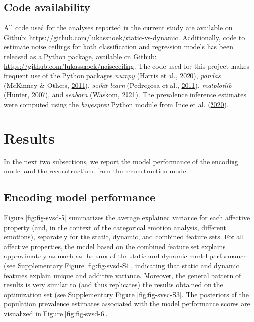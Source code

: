\documentclass[11pt,american,a4paper,oneside,]{memoir} %
\begin{document}
\hypertarget{svsd-code}{%
\subsection{Code availability}\label{svsd-code}}

All code used for the analyses reported in the current study are available on Github: \url{https://github.com/lukassnoek/static-vs-dynamic}. Additionally, code to estimate noise ceilings for both classification and regression models has been released as a Python package, available on Github: \url{https://github.com/lukassnoek/noiseceiling}. The code used for this project makes frequent use of the Python packages \emph{numpy} (Harris et al., \protect\hyperlink{ref-Harris2020-en}{2020}), \emph{pandas} (McKinney \& Others, \protect\hyperlink{ref-McKinney2011-kl}{2011}), \emph{scikit-learn} (Pedregosa et al., \protect\hyperlink{ref-pedregosa2011scikit}{2011}), \emph{matplotlib} (Hunter, \protect\hyperlink{ref-Hunter2007-at}{2007}), and \emph{seaborn} (Waskom, \protect\hyperlink{ref-waskom2021seaborn}{2021}). The prevalence inference estimates were computed using the \emph{bayesprev} Python module from Ince et al. (\protect\hyperlink{ref-Ince2020-mr}{2020}).

\hypertarget{svsd-results}{%
\section{Results}\label{svsd-results}}

In the next two subsections, we report the model performance of the encoding model and the reconstructions from the reconstruction model.

\hypertarget{encoding-model-performance}{%
\subsection{Encoding model performance}\label{encoding-model-performance}}

Figure \ref{fig:fig-svsd-5} summarizes the average explained variance for each affective property (and, in the context of the categorical emotion analysis, different emotions), separately for the static, dynamic, and combined feature sets. For all affective properties, the model based on the combined feature set explains approximately as much as the sum of the static and dynamic model performance (see Supplementary Figure \ref{fig:fig-svsd-S4}, indicating that static and dynamic features explain unique and additive variance. Moreover, the general pattern of results is very similar to (and thus replicates) the results obtained on the optimization set (see Supplementary Figure \ref{fig:fig-svsd-S3}. The posteriors of the population prevalence estimates associated with the model performance scores are visualized in Figure \ref{fig:fig-svsd-6}.
\end{document}
